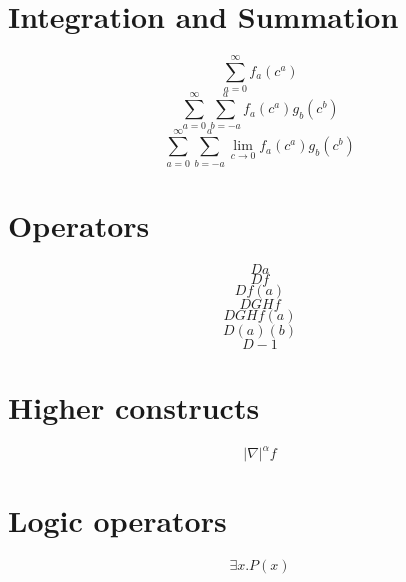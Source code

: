 \documentclass{article}
\begin{document}
\section{Integration and Summation}
\[ \sum_{a=0}^\infty f_a(c^a) \]
\[ \sum_{a=0}^\infty \sum_{b=-a}^a f_a(c^a) g_b(c^b) \]
\[ \sum_{a=0}^\infty \sum_{b=-a}^a \lim_{c\rightarrow 0} f_a(c^a) g_b(c^b) \]

\section{Operators}
\[  D a \]
\[  D f \]
\[  D f(a) \]
\[  D G H f \]
\[  D G H f (a) \]
\[  D (a) (b) \]
\[ D -1 \]

\section{Higher constructs}
\[ |\nabla|^{\alpha} f \]

\section{Logic operators}
\[ \exists x . P(x) \]
\end{document}
